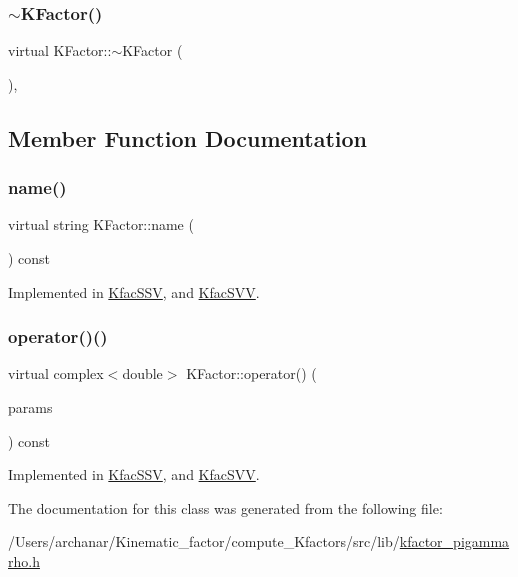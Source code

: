 \subsubsection{\texorpdfstring{$\sim$KFactor()}{~KFactor()}}
{\footnotesize\ttfamily virtual K\+Factor\+::$\sim$\+K\+Factor (\begin{DoxyParamCaption}{ }\end{DoxyParamCaption})\hspace{0.3cm}{\ttfamily [inline]}, {\ttfamily [virtual]}}



\subsection{Member Function Documentation}
\mbox{\label{classKFactor_ae578f8d6e4b525895427717da99cab6c}} 
\subsubsection{\texorpdfstring{name()}{name()}}
{\footnotesize\ttfamily virtual string K\+Factor\+::name (\begin{DoxyParamCaption}{ }\end{DoxyParamCaption}) const\hspace{0.3cm}{\ttfamily [pure virtual]}}



Implemented in \mbox{\hyperlink{classKfacSSV_a72d5e577525fa97365dbcfd4c5bea88d}{Kfac\+S\+SV}}, and \mbox{\hyperlink{classKfacSVV_ad7ab40ec924a678cd785a9743e676d6c}{Kfac\+S\+VV}}.

\mbox{\label{classKFactor_a4273897de4ef590083c7ef208b8d0f18}} 
\subsubsection{\texorpdfstring{operator()()}{operator()()}}
{\footnotesize\ttfamily virtual complex$<$double$>$ K\+Factor\+::operator() (\begin{DoxyParamCaption}\item[{const \mbox{\hyperlink{classKFacParams}{K\+Fac\+Params}} \&}]{params }\end{DoxyParamCaption}) const\hspace{0.3cm}{\ttfamily [pure virtual]}}



Implemented in \mbox{\hyperlink{classKfacSSV_ad9bddcf643847eebae9926bbc646c56c}{Kfac\+S\+SV}}, and \mbox{\hyperlink{classKfacSVV_abc4b565ae1fbf1109bbed4b05b3d5ee7}{Kfac\+S\+VV}}.



The documentation for this class was generated from the following file\+:\begin{DoxyCompactItemize}
\item 
/\+Users/archanar/\+Kinematic\+\_\+factor/compute\+\_\+\+Kfactors/src/lib/\mbox{\hyperlink{kfactor__pigammarho_8h}{kfactor\+\_\+pigammarho.\+h}}\end{DoxyCompactItemize}
